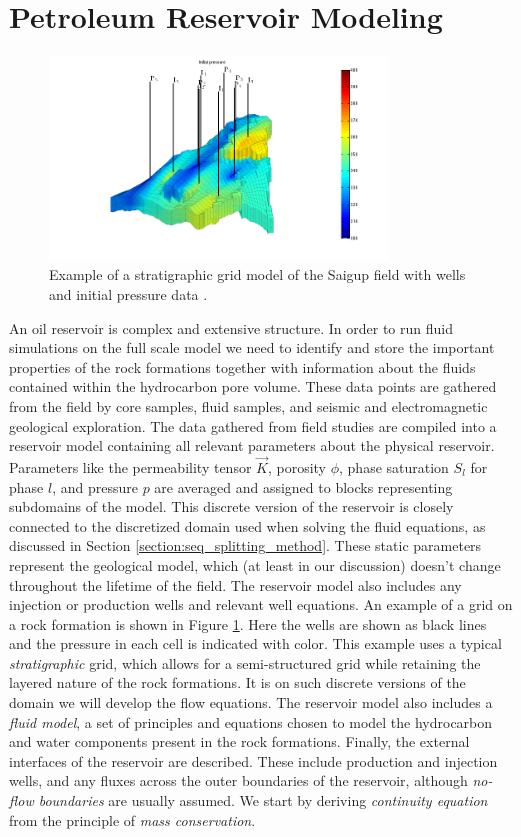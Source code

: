 \section{Petroleum Reservoir Modeling}
\label{section:reservoir_modeling}
\begin{figure}
\centering
\includegraphics[trim=3cm 0cm 2cm 0cm,width=0.8\textwidth]{figures/saigup_field_pressure.png}
\caption{Example of a stratigraphic grid model of the Saigup field with wells and initial pressure data \citep{saigup_2003}.}
\label{fig:saigup_field_pressure}
\end{figure}
An oil reservoir is complex and extensive structure. In order to run fluid simulations on the full scale model we need to identify and store the important properties of the rock formations together with information about the fluids contained within the hydrocarbon pore volume. These data points are gathered from the field by core samples, fluid samples, and seismic and electromagnetic geological exploration. The data gathered from field studies are compiled into a reservoir model containing all relevant parameters about the physical reservoir. Parameters like the permeability tensor $\vec{K}$, porosity $\phi$, phase saturation $S_l$ for phase $l$, and pressure $p$ are averaged and assigned to blocks representing subdomains of the model. This discrete version of the reservoir is closely connected to the discretized domain used when solving the fluid equations, as discussed in Section \ref{section:seq_splitting_method}. These static parameters represent the geological model, which (at least in our discussion) doesn't change throughout the lifetime of the field. The reservoir model also includes any injection or production wells and relevant well equations. An example of a grid on a rock formation is shown in Figure \ref{fig:saigup_field_pressure}. Here the wells are shown as black lines and the pressure in each cell is indicated with color. This example uses a typical \emph{stratigraphic} grid, which allows for a semi-structured grid while retaining the layered nature of the rock formations. It is on such discrete versions of the domain we will develop the flow equations. The reservoir model also includes a \emph{fluid model}, a set of principles and equations chosen to model the hydrocarbon and water components present in the rock formations. Finally, the external interfaces of the reservoir are described. These include production and injection wells, and any fluxes across the outer boundaries of the reservoir, although \emph{no-flow boundaries} are usually assumed. We start by deriving \emph{continuity equation} from the principle of \emph{mass conservation}.

